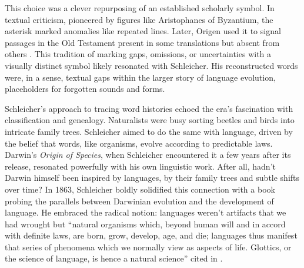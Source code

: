 This choice was a clever repurposing of an established scholarly symbol. In textual criticism, pioneered by figures like Aristophanes of Byzantium, the asterisk marked anomalies like repeated lines. Later, Origen used it to signal passages in the Old Testament present in some translations but absent from others \citep{Grafton2010}. This tradition of marking gaps, omissions, or uncertainties with a visually distinct symbol likely resonated with Schleicher. His reconstructed words were, in a sense, textual gaps within the larger story of language evolution, placeholders for forgotten sounds and forms.

Schleicher's approach to tracing word histories echoed the era's fascination with classification and genealogy. Naturalists were busy sorting beetles and birds into intricate family trees. Schleicher aimed to do the same with language, driven by the belief that words, like organisms, evolve according to predictable laws. Darwin's \textit{Origin of Species}, when Schleicher encountered it a few years after its release, resonated powerfully with his own linguistic work. After all, hadn't Darwin himself been inspired by languages, by their family trees and subtle shifts over time? In 1863, Schleicher boldly solidified this connection with a book probing the parallels between Darwinian evolution and the development of language. He embraced the radical notion: languages weren't artifacts that we had wrought but ``natural organisms which, beyond human will and in accord with definite laws, are born, grow, develop, age, and die; languages thus manifest that series of phenomena which we normally view as aspects of life. Glottics, or the science of language, is hence a natural science'' \citep[7]{schleicher1863} cited in \citep[82]{Goldsmith2019}.



